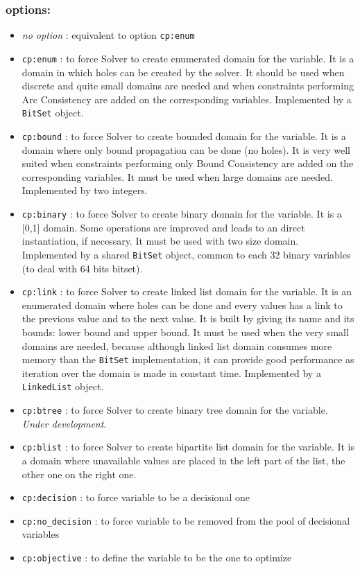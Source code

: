 \subsubsection{options:}
	\begin{itemize}
		\item \emph{no option} : equivalent to option \texttt{cp:enum}
		\item \texttt{cp:enum} : to force Solver to create enumerated domain for the variable. It is a domain in which holes can be created by the solver. It should be used when discrete and quite small domains are needed and when constraints performing Arc Consistency are added on the corresponding variables. Implemented by a \texttt{BitSet} object.
		\item \texttt{cp:bound} : to force Solver to create bounded domain for the variable. It is a domain where only bound propagation can be done (no holes). It is very well suited when constraints performing only Bound Consistency are added on the corresponding variables. It must be used when large domains are needed. Implemented by two integers.
		\item \texttt{cp:binary} : to force Solver to create binary domain for the variable. It is a [0,1] domain. Some operations are improved and leads to an direct instantiation, if necessary. It must be used with two size domain. Implemented by a shared \texttt{BitSet} object, common to each 32 binary variables (to deal with 64 bits bitset).
		\item \texttt{cp:link} : to force Solver to create linked list domain for the variable. It is an enumerated domain where holes can be done and every values has a link to the previous value and to the next value. It is built by giving its name and its bounds: lower bound and upper bound. It must be used when the very small domains are needed, because although linked list domain consumes more memory than the \texttt{BitSet} implementation, it can provide good performance as iteration over the domain is made in constant time. Implemented by a \texttt{LinkedList} object.
		\item \texttt{cp:btree} : to force Solver to create binary tree domain for the variable. \emph{Under development}.
		\item \texttt{cp:blist} : to force Solver to create bipartite list domain for the variable. It is a domain where unavailable values are placed in the left part of the list, the other one on the right one.
		\item \texttt{cp:decision} : to force variable to be a decisional one
		\item \texttt{cp:no\_decision} : to force variable to be removed from the pool of decisional variables
		\item \texttt{cp:objective} : to define the variable to be the one to optimize
	\end{itemize}
